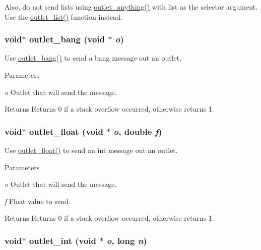 Also, do not send lists using \hyperlink{group__inout_ga12798ee897e01dac21ee547c4091d8a8}{outlet\_\-anything()} with list as the selector argument. Use the \hyperlink{group__inout_gabdef4fbe6e1040dc28204b8070bdcda5}{outlet\_\-list()} function instead. \hypertarget{group__inout_ga357498d7143fd266facfbfc4efa59029}{
\subsubsection[{outlet\_\-bang}]{\setlength{\rightskip}{0pt plus 5cm}void$\ast$ outlet\_\-bang (void $\ast$ {\em o})}}
\label{group__inout_ga357498d7143fd266facfbfc4efa59029}


Use \hyperlink{group__inout_ga357498d7143fd266facfbfc4efa59029}{outlet\_\-bang()} to send a bang message out an outlet. 
\begin{DoxyParams}{Parameters}
\item[{\em o}]Outlet that will send the message. \end{DoxyParams}
\begin{DoxyReturn}{Returns}
Returns 0 if a stack overflow occurred, otherwise returns 1. 
\end{DoxyReturn}
\hypertarget{group__inout_gafbb3f62a413f05a394391afde5b3c30f}{
\subsubsection[{outlet\_\-float}]{\setlength{\rightskip}{0pt plus 5cm}void$\ast$ outlet\_\-float (void $\ast$ {\em o}, \/  double {\em f})}}
\label{group__inout_gafbb3f62a413f05a394391afde5b3c30f}


Use \hyperlink{group__inout_gafbb3f62a413f05a394391afde5b3c30f}{outlet\_\-float()} to send an int message out an outlet. 
\begin{DoxyParams}{Parameters}
\item[{\em o}]Outlet that will send the message. \item[{\em f}]Float value to send. \end{DoxyParams}
\begin{DoxyReturn}{Returns}
Returns 0 if a stack overflow occurred, otherwise returns 1. 
\end{DoxyReturn}
\hypertarget{group__inout_ga0b2b38216f2f4dba486bfcd2273f255e}{
\subsubsection[{outlet\_\-int}]{\setlength{\rightskip}{0pt plus 5cm}void$\ast$ outlet\_\-int (void $\ast$ {\em o}, \/  long {\em n})}}
\label{group__inout_ga0b2b38216f2f4dba486bfcd2273f255e}


